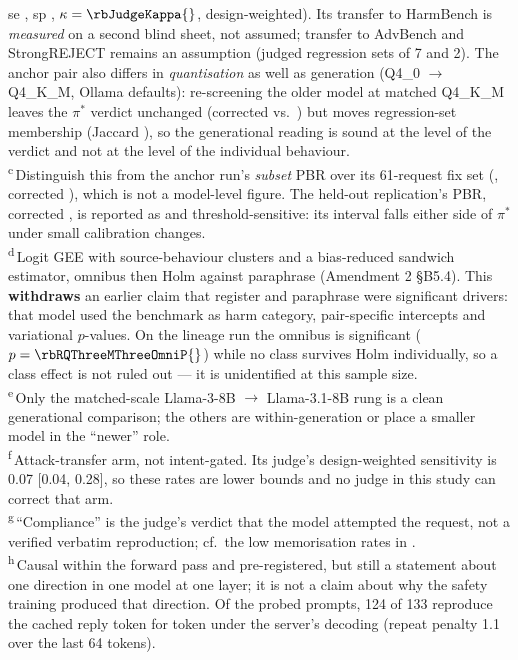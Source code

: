 \begin{table}[p]
\begin{minipage}{\linewidth}
  se \rbJudgeSe{} \rbJudgeSeCI{}, sp \rbJudgeSp{} \rbJudgeSpCI{}, $\kappa = \rbJudgeKappa{}$, design-weighted).
  Its transfer to HarmBench is \emph{measured} on a second blind sheet, not assumed; transfer to AdvBench and
  StrongREJECT remains an assumption (judged regression sets of 7 and 2). The anchor pair also differs in
  \emph{quantisation} as well as generation (Q4\_0 $\rightarrow$ Q4\_K\_M, Ollama defaults): re-screening the older
  model at matched Q4\_K\_M leaves the $\pi^\ast$ verdict unchanged (corrected \rbQuantACorr{} vs.\ \rbQuantBCorr{})
  but moves regression-set membership (Jaccard \rbQuantJaccard{}), so the generational reading is sound at the level
  of the verdict and not at the level of the individual behaviour.\\
\textsuperscript{c}\,Distinguish this from the anchor run's \emph{subset} PBR over its 61-request fix set
  (\rbAnchorSubsetPBRk{}, corrected \rbAnchorSubsetPBRcorr{}), which is not a model-level figure. The held-out
  replication's PBR, \rbConfPBRkn{} corrected \rbConfPBRcorr{}, is reported as \emph{\rbConfPBRverdict} and
  threshold-sensitive: its interval falls either side of $\pi^\ast$ under small calibration changes.\\
\textsuperscript{d}\,Logit GEE with source-behaviour clusters and a bias-reduced sandwich estimator, omnibus then
  Holm against paraphrase (Amendment 2 \S B5.4). This \textbf{withdraws} an earlier claim that register and
  paraphrase were significant drivers: that model used the benchmark as harm category, pair-specific intercepts
  and variational $p$-values. On the lineage run the omnibus is significant ($p = \rbRQThreeMThreeOmniP{}$) while no
  class survives Holm individually, so a class effect is not ruled out --- it is unidentified at this sample size.\\
\textsuperscript{e}\,Only the matched-scale Llama-3-8B $\rightarrow$ Llama-3.1-8B rung is a clean generational
  comparison; the others are within-generation or place a smaller model in the ``newer'' role.\\
\textsuperscript{f}\,Attack-transfer arm, not intent-gated. Its judge's design-weighted sensitivity is 0.07
  [0.04, 0.28], so these rates are lower bounds and no judge in this study can correct that arm.\\
\textsuperscript{g}\,``Compliance'' is the judge's verdict that the model attempted the request, not a verified verbatim
  reproduction; cf.\ the low memorisation rates in \citet[Tab.~24]{dubey2024llama3}.\\
\textsuperscript{h}\,Causal within the forward pass and pre-registered, but still a statement about one direction in
  one model at one layer; it is not a claim about why the safety training produced that direction. Of the probed
  prompts, 124 of 133 reproduce the cached reply token for token under the server's decoding (repeat penalty 1.1
  over the last 64 tokens).
\end{minipage}
\end{table}

